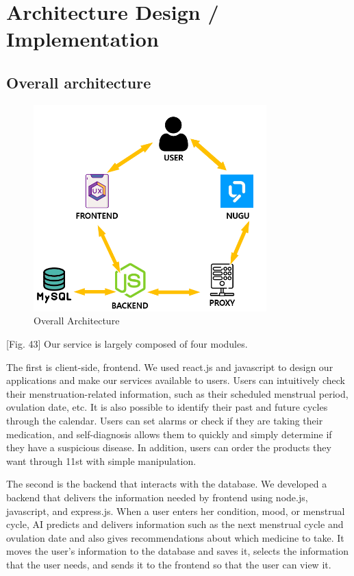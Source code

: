 \documentclass[conference]{IEEEtran}
\begin{document}
    
\section{Architecture Design / Implementation}
\subsection{Overall architecture}
\begin{figure}[ht]
\includegraphics[width=9cm, center]{ovarchi.PNG}
\caption{Overall Architecture}
\label{fig43}
\end{figure}
[Fig. 43] Our service is largely composed of four modules. 

The first is client-side, frontend. We used react.js and javascript to design our applications and make our services available to users. Users can intuitively check their menstruation-related information, such as their scheduled menstrual period, ovulation date, etc. It is also possible to identify their past and future cycles through the calendar. Users can set alarms or check if they are taking their medication, and self-diagnosis allows them to quickly and simply determine if they have a suspicious disease. In addition, users can order the products they want through 11st with simple manipulation. 

The second is the backend that interacts with the database. We developed a backend that delivers the information needed by frontend using node.js, javascript, and express.js. When a user enters her condition, mood, or menstrual cycle, AI predicts and delivers information such as the next menstrual cycle and ovulation date and also gives recommendations about which medicine to take. It moves the user's information to the database and saves it, selects the information that the user needs, and sends it to the frontend so that the user can view it.
\end{document}

